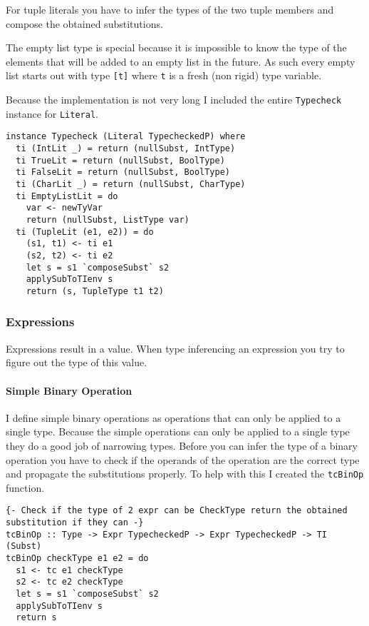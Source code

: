 \documentclass{report}
\begin{document}
For tuple literals you have to infer the types of the two tuple members and compose the obtained substitutions.

The empty list type is special because it is impossible to know the type of the elements that will be added to an empty list in the future. As such every empty list starts out with type \texttt{[t]} where \texttt{t} is a fresh (non rigid) type variable. 


Because the implementation is not very long I included the entire \texttt{Typecheck} instance for \texttt{Literal}.

\begin{verbatim}
instance Typecheck (Literal TypecheckedP) where
  ti (IntLit _) = return (nullSubst, IntType)
  ti TrueLit = return (nullSubst, BoolType)
  ti FalseLit = return (nullSubst, BoolType)
  ti (CharLit _) = return (nullSubst, CharType)
  ti EmptyListLit = do
    var <- newTyVar
    return (nullSubst, ListType var) 
  ti (TupleLit (e1, e2)) = do
    (s1, t1) <- ti e1
    (s2, t2) <- ti e2
    let s = s1 `composeSubst` s2
    applySubToTIenv s
    return (s, TupleType t1 t2)
\end{verbatim}



\subsubsection{Expressions}

Expressions result in a value. When type inferencing an expression you try to figure out the type of this value. 

\paragraph{Simple Binary Operation} I define simple binary operations as operations that can only be applied to a single type. Because the simple operations can only be applied to a single type they do a good job of narrowing types. Before you can infer the type of a binary operation you have to check if the operands of the operation are the correct type and propagate the substitutions properly. To help with this I created the \texttt{tcBinOp} function.

\begin{verbatim}
{- Check if the type of 2 expr can be CheckType return the obtained substitution if they can -}
tcBinOp :: Type -> Expr TypecheckedP -> Expr TypecheckedP -> TI (Subst)
tcBinOp checkType e1 e2 = do
  s1 <- tc e1 checkType
  s2 <- tc e2 checkType
  let s = s1 `composeSubst` s2
  applySubToTIenv s
  return s
\end{verbatim}
\end{document}
